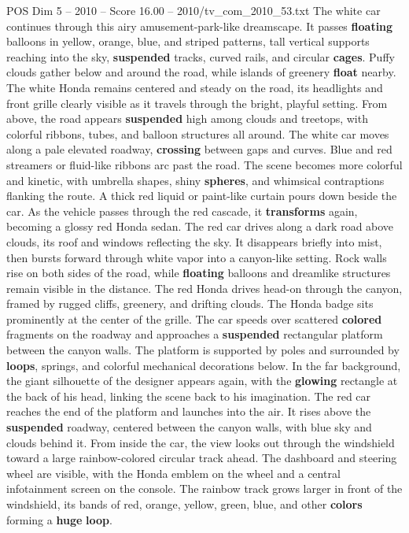 \begin{textsample}{POS Dim 5 – 2010 – Score 16.00 – 2010/tv\_com\_2010\_53.txt}
The white car continues through this airy amusement-park-like dreamscape.
It passes \textbf{floating} balloons in yellow, orange, blue, and striped patterns, tall vertical supports reaching into the sky, \textbf{suspended} tracks, curved rails, and circular \textbf{cages}.
Puffy clouds gather below and around the road, while islands of greenery \textbf{float} nearby.
The white Honda remains centered and steady on the road, its headlights and front grille clearly visible as it travels through the bright, playful setting.
From above, the road appears \textbf{suspended} high among clouds and treetops, with colorful ribbons, tubes, and balloon structures all around.
The white car moves along a pale elevated roadway, \textbf{crossing} between gaps and curves.
Blue and red streamers or fluid-like ribbons arc past the road.
The scene becomes more colorful and kinetic, with umbrella shapes, shiny \textbf{spheres}, and whimsical contraptions flanking the route.
A thick red liquid or paint-like curtain pours down beside the car.
As the vehicle passes through the red cascade, it \textbf{transforms} again, becoming a glossy red Honda sedan.
The red car drives along a dark road above clouds, its roof and windows reflecting the sky.
It disappears briefly into mist, then bursts forward through white vapor into a canyon-like setting.
Rock walls rise on both sides of the road, while \textbf{floating} balloons and dreamlike structures remain visible in the distance.
The red Honda drives head-on through the canyon, framed by rugged cliffs, greenery, and drifting clouds.
The Honda badge sits prominently at the center of the grille.
The car speeds over scattered \textbf{colored} fragments on the roadway and approaches a \textbf{suspended} rectangular platform between the canyon walls.
The platform is supported by poles and surrounded by \textbf{loops}, springs, and colorful mechanical decorations below.
In the far background, the giant silhouette of the designer appears again, with the \textbf{glowing} rectangle at the back of his head, linking the scene back to his imagination.
The red car reaches the end of the platform and launches into the air.
It rises above the \textbf{suspended} roadway, centered between the canyon walls, with blue sky and clouds behind it.
From inside the car, the view looks out through the windshield toward a large rainbow-colored circular track ahead.
The dashboard and steering wheel are visible, with the Honda emblem on the wheel and a central infotainment screen on the console.
The rainbow track grows larger in front of the windshield, its bands of red, orange, yellow, green, blue, and other \textbf{colors} forming a \textbf{huge} \textbf{loop}.

\end{textsample}
